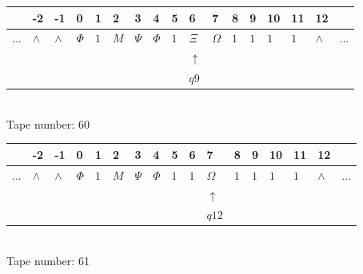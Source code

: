 \documentclass[11pt]{article}
\begin{document}
\begin{table}[H]
\centering
\begin{tabular}{lllllllllllllllll}
 & -2 & -1 & 0 & 1 & 2 & 3 & 4 & 5 & 6 & 7 & 8 & 9 & 10 & 11 & 12 & \\
\hline
$...$ & \multicolumn{1}{|l|}{$\wedge$} & \multicolumn{1}{|l|}{$\wedge$} & \multicolumn{1}{|l|}{$\Phi$} & \multicolumn{1}{|l|}{$1$} & \multicolumn{1}{|l|}{$M$} & \multicolumn{1}{|l|}{$\Psi$} & \multicolumn{1}{|l|}{$\Phi$} & \multicolumn{1}{|l|}{$1$} & \multicolumn{1}{|l|}{$\Xi$} & \multicolumn{1}{|l|}{$\Omega$} & \multicolumn{1}{|l|}{$1$} & \multicolumn{1}{|l|}{$1$} & \multicolumn{1}{|l|}{$1$} & \multicolumn{1}{|l|}{$1$} & \multicolumn{1}{|l|}{$\wedge$} & $...$\\
\hline
&  &  &  &  &  &  &  &  & $\uparrow$ &  &  &  &  &  &  &  \\
&  &  &  &  &  &  &  &  & $ q9 $ &  &  &  &  &  &  &  \\
\end{tabular}
\\
Tape number: 60
\noindent\makebox[\linewidth]{\hdashrule{\textwidth}{1pt}{1pt}}\end{table}

\begin{table}[H]
\centering
\begin{tabular}{lllllllllllllllll}
 & -2 & -1 & 0 & 1 & 2 & 3 & 4 & 5 & 6 & 7 & 8 & 9 & 10 & 11 & 12 & \\
\hline
$...$ & \multicolumn{1}{|l|}{$\wedge$} & \multicolumn{1}{|l|}{$\wedge$} & \multicolumn{1}{|l|}{$\Phi$} & \multicolumn{1}{|l|}{$1$} & \multicolumn{1}{|l|}{$M$} & \multicolumn{1}{|l|}{$\Psi$} & \multicolumn{1}{|l|}{$\Phi$} & \multicolumn{1}{|l|}{$1$} & \multicolumn{1}{|l|}{$1$} & \multicolumn{1}{|l|}{$\Omega$} & \multicolumn{1}{|l|}{$1$} & \multicolumn{1}{|l|}{$1$} & \multicolumn{1}{|l|}{$1$} & \multicolumn{1}{|l|}{$1$} & \multicolumn{1}{|l|}{$\wedge$} & $...$\\
\hline
&  &  &  &  &  &  &  &  &  & $\uparrow$ &  &  &  &  &  &  \\
&  &  &  &  &  &  &  &  &  & $ q12 $ &  &  &  &  &  &  \\
\end{tabular}
\\
Tape number: 61
\noindent\makebox[\linewidth]{\hdashrule{\textwidth}{1pt}{1pt}}\end{table}
\end{document}
